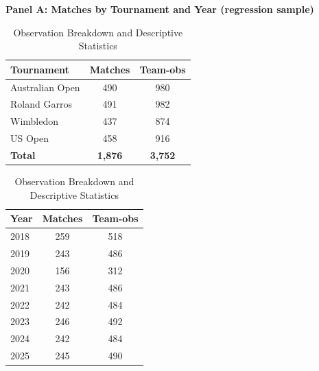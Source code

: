 \documentclass[10pt]{article}
\begin{document}
\begin{table}[htbp]
\color{blue}
\centering
\caption{Observation Breakdown and Descriptive Statistics}
\label{tab:t1}
\begin{threeparttable}
\textbf{Panel A: Matches by Tournament and Year (regression sample)}\\[2pt]
\begin{tabular}{lcc}
\toprule
Tournament & Matches & Team-obs \\
\midrule
Australian Open & 490 & 980 \\
Roland Garros & 491 & 982 \\
Wimbledon & 437 & 874 \\
US Open & 458 & 916 \\
\midrule
\textbf{Total} & \textbf{1,876} & \textbf{3,752} \\
\bottomrule
\end{tabular}
\hspace{1cm}
\begin{tabular}{lcc}
\toprule
Year & Matches & Team-obs \\
\midrule
2018 & 259 & 518 \\
2019 & 243 & 486 \\
2020 & 156 & 312 \\
2021 & 243 & 486 \\
2022 & 242 & 484 \\
2023 & 246 & 492 \\
2024 & 242 & 484 \\
2025 & 245 & 490 \\
\bottomrule
\end{tabular}


\end{threeparttable}
\end{table}
\end{document}
